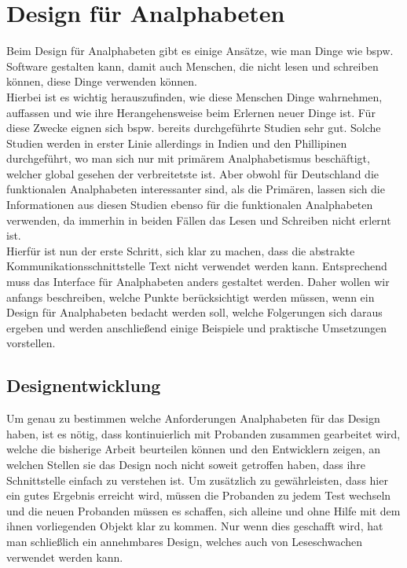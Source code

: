 \section{Design für Analphabeten}

Beim Design für Analphabeten gibt es einige Ansätze, wie man Dinge wie bspw. Software gestalten kann, damit auch Menschen, die nicht lesen und schreiben können, diese Dinge verwenden können.\\
Hierbei ist es wichtig herauszufinden, wie diese Menschen Dinge wahrnehmen, auffassen und wie ihre Herangehensweise beim Erlernen neuer Dinge ist. Für diese Zwecke eignen sich bspw. bereits durchgeführte Studien sehr gut. Solche Studien werden in erster Linie allerdings in Indien und den Phillipinen durchgeführt, wo man sich nur mit primärem Analphabetismus beschäftigt, welcher global gesehen der verbreitetste ist. Aber obwohl für Deutschland die funktionalen Analphabeten interessanter sind, als die Primären, lassen sich die Informationen aus diesen Studien ebenso für die funktionalen Analphabeten verwenden, da immerhin in beiden Fällen das Lesen und Schreiben nicht erlernt ist.\\
Hierfür ist nun der erste Schritt, sich klar zu machen, dass die abstrakte Kommunikationsschnittstelle Text nicht verwendet werden kann. Entsprechend muss das Interface für Analphabeten anders gestaltet werden. Daher wollen wir anfangs beschreiben, welche Punkte berücksichtigt werden müssen, wenn ein Design für Analphabeten bedacht werden soll, welche Folgerungen sich daraus ergeben und werden anschließend einige Beispiele und praktische Umsetzungen vorstellen.

\subsection{Designentwicklung}
Um genau zu bestimmen welche Anforderungen Analphabeten für das Design haben, ist es nötig, dass kontinuierlich mit Probanden zusammen gearbeitet wird, welche die bisherige Arbeit beurteilen können und den Entwicklern zeigen, an welchen Stellen sie das Design noch nicht soweit getroffen haben, dass ihre Schnittstelle einfach zu verstehen ist. Um zusätzlich zu gewährleisten, dass hier ein gutes Ergebnis erreicht wird, müssen die Probanden zu jedem Test wechseln und die neuen Probanden müssen es schaffen, sich alleine und ohne Hilfe mit dem ihnen vorliegenden Objekt klar zu kommen. Nur wenn dies geschafft wird, hat man schließlich ein annehmbares Design, welches auch von Leseschwachen verwendet werden kann.\\

